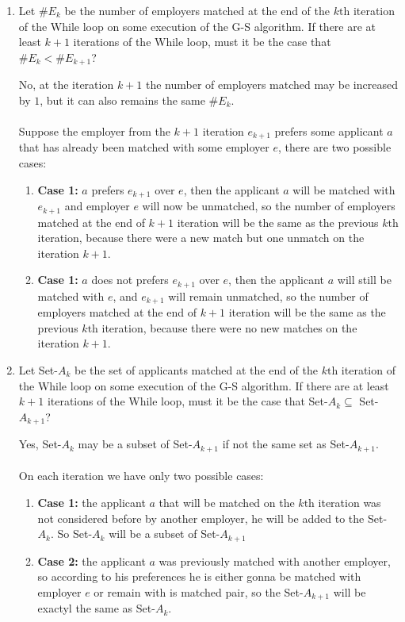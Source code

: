 \documentclass[11pt]{article}
\def\ans#1{{\color{ans}#1}}
\begin{document}
\begin{enumerate}
\item Let $\#E_k$ be the number of employers matched at the end of the
$k\mbox{th}$ iteration of the While loop on some execution of the
G-S algorithm. If there are at least $k+1$ iterations of the
While loop, must it be the case that $\#E_k < \#E_{k+1}$? \\

\ans{
  No, at the iteration $k+1$ the number of employers matched may be increased by $1$, 
  but it can also remains the same $\#E_k$. \\ \\
  Suppose the employer from the $k+1$ iteration $e_{k+1}$
  prefers some applicant $a$ that has already been matched with some employer $e$, 
  there are two possible cases:
  \begin{enumerate}
    \item \textbf{Case 1:} $a$ prefers $e_{k+1}$ over $e$, then the applicant $a$ will be 
    matched with $e_{k+1}$ and employer $e$ will now be unmatched, so the number of employers 
    matched at the end of $k+1$ iteration will be the same as the previous $k\mbox{th}$ iteration,
    because there were a new match but one unmatch on the iteration $k+1$.
    \item \textbf{Case 1:} $a$ does not prefers $e_{k+1}$ over $e$, then the applicant $a$ will still
    be matched with $e$, and $e_{k+1}$ will remain unmatched, so the number of employers 
    matched at the end of $k+1$ iteration will be the same as the previous $k\mbox{th}$ iteration, 
    because there were no new matches on the iteration $k+1$.
  \end{enumerate}
}

\item Let Set-$A_k$ be the set of applicants matched at
the end of the $k\mbox{th}$ iteration of the While loop on some
execution of the G-S
algorithm. If there are at least $k+1$ iterations of the
While loop, must it be the case that 
Set-$A_k \subseteq$ Set-$A_{k+1}$?

\ans{
  Yes, Set-$A_k$ may be a subset of Set-$A_{k+1}$ if not the same set as Set-$A_{k+1}$. \\ \\
  On each iteration we have only two possible cases:
  \begin{enumerate}
    \item \textbf{Case 1:} the applicant $a$ that will be matched on the $k\mbox{th}$ iteration was 
    not considered before by another employer, he will be added to the Set-$A_k$. So Set-$A_k$
    will be a subset of Set-$A_{k+1}$
    \item \textbf{Case 2:} the applicant $a$ was previously matched with another employer, so according 
    to his preferences he is either gonna be matched with employer $e$ or remain with is matched pair,
    so the Set-$A_{k+1}$ will be exactyl the same as Set-$A_k$.
  \end{enumerate}
}


\end{enumerate}
\end{document}
